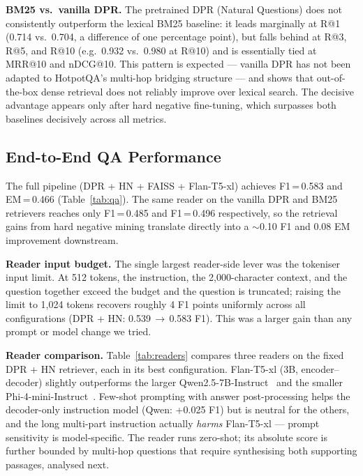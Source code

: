 \documentclass{llncs}
\begin{document}
\noindent\textbf{BM25 vs.\ vanilla DPR.}
The pretrained DPR (Natural Questions) does not consistently outperform the
lexical BM25 baseline: it leads marginally at R@1 (0.714 vs.\ 0.704, a
difference of one percentage point), but falls behind at R@3, R@5, and R@10
(e.g.\ 0.932 vs.\ 0.980 at R@10) and is essentially tied at MRR@10 and
nDCG@10. This pattern is expected --- vanilla DPR has not been adapted to
HotpotQA's multi-hop bridging structure --- and shows that out-of-the-box
dense retrieval does not reliably improve over lexical search. The decisive
advantage appears only after hard negative fine-tuning, which surpasses both
baselines decisively across all metrics.

\subsection{End-to-End QA Performance}

The full pipeline (DPR + HN + FAISS + Flan-T5-xl) achieves F1\,=\,0.583 and
EM\,=\,0.466 (Table~\ref{tab:qa}). The same reader on the vanilla DPR and BM25
retrievers reaches only F1\,=\,0.485 and F1\,=\,0.496 respectively, so the
retrieval gains from hard negative mining translate directly into a $\sim$0.10
F1 and 0.08 EM improvement downstream.

\noindent\textbf{Reader input budget.}
The single largest reader-side lever was the tokeniser input limit. At 512
tokens, the instruction, the 2{,}000-character context, and the question
together exceed the budget and the question is truncated; raising the limit to
1{,}024 tokens recovers roughly 4 F1 points uniformly across all configurations
(DPR + HN: 0.539\,$\to$\,0.583 F1). This was a larger gain than any prompt or
model change we tried.

\noindent\textbf{Reader comparison.}
Table~\ref{tab:readers} compares three readers on the fixed DPR + HN retriever,
each in its best configuration. Flan-T5-xl (3B, encoder--decoder) slightly
outperforms the larger Qwen2.5-7B-Instruct~\cite{qwen2.5} and the smaller
Phi-4-mini-Instruct~\cite{phi4}. Few-shot prompting with answer post-processing helps the
decoder-only instruction model (Qwen: +0.025 F1) but is neutral for the others,
and the long multi-part instruction actually \emph{harms} Flan-T5-xl ---
prompt sensitivity is model-specific. The reader runs zero-shot; its absolute
score is further bounded by multi-hop questions that require synthesising both
supporting passages, analysed next.
\end{document}
